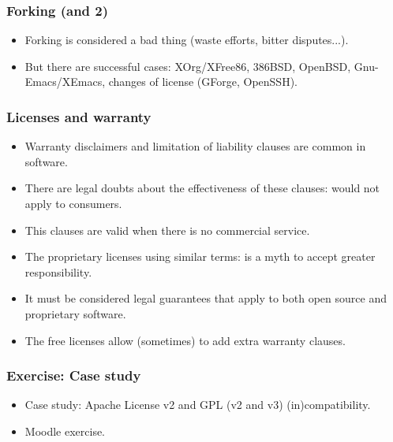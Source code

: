 
\begin{frame}
\frametitle{Forking (and 2)}

\begin{itemize}
\item Forking is considered a bad thing (waste efforts, bitter disputes...).
\item But there are successful cases: XOrg/XFree86, 386BSD, OpenBSD, Gnu-Emacs/XEmacs, changes of license (GForge, OpenSSH).
\end{itemize}

\end{frame}



\begin{frame}
\frametitle{Licenses and warranty}

\begin{itemize}
\item Warranty disclaimers and limitation of liability clauses are common in software.
\item There are legal doubts about the effectiveness of these clauses: \alert{would not apply to consumers}.
\item This clauses are valid when there is \alert{no commercial service}.
\item The proprietary licenses using similar terms: is a myth to accept greater responsibility.
\item It must be considered legal guarantees that apply to both open source and proprietary software.
\item The free licenses allow (sometimes) to add extra warranty clauses.
\end{itemize}


\end{frame}


\begin{frame}
\frametitle{Exercise: Case study}


\begin{itemize}
\item Case study: Apache License v2 and GPL (v2 and v3)  (in)compatibility.
\item Moodle exercise.
\end{itemize}

\end{frame}


